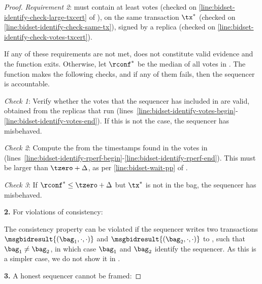 \begin{proof}
    \emph{Requirement 2}: \txcert must contain at least \alpha votes (checked on \cref{line:bidset-identify-check-large-txcert} of ), on the same transaction $\tx^*$ (checked on \cref{line:bidset-identify-check-same-tx}), signed by a \podInst replica (checked on \cref{line:bidset-identify-check-votes-txcert}).

    If any of these requirements are not met, \tran does not constitute valid evidence and the function exits. Otherwise, let $\rconf^*$ be the median of all votes in \txcert. The function makes the following checks, and if any of them fails, then the sequencer is accountable.

    \emph{Check 1}: Verify whether the votes that the sequencer has included in \bidcert are valid, obtained from the replicas that run \podInst (lines~\ref{line:bidset-identify-votes-begin}-\ref{line:bidset-identify-votes-end}). If this is not the case, the sequencer has misbehaved.

    \emph{Check 2}: Compute the \rperf from the timestamps found in the votes in \bidcert (lines~\ref{line:bidset-identify-rperf-begin}-\ref{line:bidset-identify-rperf-end}). This \rperf must be larger than $\tzero + \Delta$, as per \cref{line:bidset-wait-pp} of .

    \emph{Check 3}: If $\rconf^* \leq \tzero+\Delta$ but $\tx^*$ is not in the bag, the sequencer has misbehaved.

    \textbf{2.} For violations of consistency:

    \noindent
    The consistency property can be violated if the sequencer writes two transactions $\msgbidresult{(\bag_1, \cdot, \cdot)}$ and $\msgbidresult{(\bag_2, \cdot,\cdot)}$ to \podInst, such that $\bag_1 \neq \bag_2$, in which case $\bag_1$ and $\bag_2$ identify the sequencer. As this is a simpler case, we do not show it in .

    \textbf{3.} A honest sequencer cannot be framed:


\end{proof}
